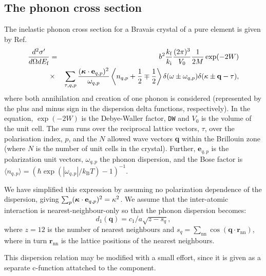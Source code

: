\subsection{The phonon cross section} %
The inelastic phonon cross section for a Bravais crystal of a pure element
is given by Ref.~\cite[ch.3~]{squires}
\begin{eqnarray}
\frac{d^2\sigma'}{d\Omega dE_\textrm{f}} &=&
  b^2 \frac{k_\textrm{f}}{k_\textrm{i}} \frac{(2\pi)^3}{V_0}\frac{1}{2M} \exp(-2W) \nonumber \\
&\times&
  \sum_{\tau,q,p} \frac{(\mbox{\boldmath $\kappa$} \cdot \textbf{e}_{q,p})^2}
                       {\omega_{q,p}}
  \left\langle n_{q,p} + \frac{1}{2} \mp \frac{1}{2} \right\rangle
  \delta(\omega\pm\omega_{q,p}) \delta(\kappa\pm\textbf{q}-\tau) ,
\end{eqnarray}
where both annihilation and creation of one phonon is considered
(represented by the plus and minus sign in the dispersion delta functions,
respectively).
In the equation,
$\exp(-2W)$ is the Debye-Waller factor, \verb+DW+ and
$V_0 $ is the volume of the unit cell.
The sum runs over the reciprocal lattice vectors, $\tau$,
over the polarisation index, $p$,
and the $N$ allowed wave vectors \textbf{q} within the Brillouin zone
(where $N$ is the number of unit cells in the crystal).
Further, $\textbf{e}_{q,p}$ is the
polarization unit vectors, $\omega_{q,p}$ the phonon dispersion,
and the Bose factor is
$\langle n_{q,p} \rangle = (\hbar \exp(|\omega_{q,p}|/k_\textrm{B}T)-1)^{-1}$.

We have simplified this expression by assuming no polarization
dependence of the dispersion, giving
$\sum_{p} (\mbox{\boldmath $\kappa$} \cdot \textbf{e}_{q,p})^2 = \kappa^2$.
We assume that the inter-atomic interaction is nearest-neighbour-only
so that the phonon dispersion becomes:
\begin{equation}
d_1(\textbf{q}) = c_1/a \sqrt{z-s_q} ,
\end{equation}
where $z=12$ is the number of nearest neighbours and
$s_q=\sum_\textrm{nn} \cos(\textbf{q} \cdot \textbf{r}_\textrm{nn})$,
where in turn $\textbf{r}_\textrm{nn}$ is the lattice positions of the
nearest neighbours.

This dispersion relation may be modified with a small effort,
since it is given as a separate c-function attatched to the component.

